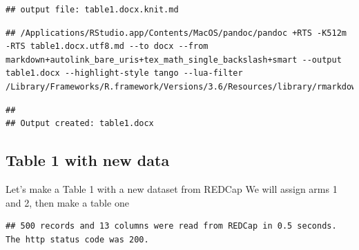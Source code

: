 \documentclass[
]{book}
\newenvironment{Shaded}{\begin{snugshade}}{\end{snugshade}}
\newcommand{\CommentTok}[1]{\textcolor[rgb]{0.56,0.35,0.01}{\textit{#1}}}
\newcommand{\DataTypeTok}[1]{\textcolor[rgb]{0.13,0.29,0.53}{#1}}
\newcommand{\DecValTok}[1]{\textcolor[rgb]{0.00,0.00,0.81}{#1}}
\newcommand{\KeywordTok}[1]{\textcolor[rgb]{0.13,0.29,0.53}{\textbf{#1}}}
\newcommand{\NormalTok}[1]{#1}
\newcommand{\OperatorTok}[1]{\textcolor[rgb]{0.81,0.36,0.00}{\textbf{#1}}}
\newcommand{\StringTok}[1]{\textcolor[rgb]{0.31,0.60,0.02}{#1}}
\begin{document}
\begin{verbatim}
## output file: table1.docx.knit.md
\end{verbatim}

\begin{verbatim}
## /Applications/RStudio.app/Contents/MacOS/pandoc/pandoc +RTS -K512m -RTS table1.docx.utf8.md --to docx --from markdown+autolink_bare_uris+tex_math_single_backslash+smart --output table1.docx --highlight-style tango --lua-filter /Library/Frameworks/R.framework/Versions/3.6/Resources/library/rmarkdown/rmd/lua/pagebreak.lua
\end{verbatim}

\begin{verbatim}
## 
## Output created: table1.docx
\end{verbatim}

\hypertarget{table-1-with-new-data}{%
\subsection{Table 1 with new data}\label{table-1-with-new-data}}

Let's make a Table 1 with a new dataset from REDCap
We will assign arms 1 and 2, then make a table one

\begin{Shaded}
\end{Shaded}

\begin{verbatim}
## 500 records and 13 columns were read from REDCap in 0.5 seconds.  The http status code was 200.
\end{verbatim}

\begin{Shaded}
\end{Shaded}
\end{document}
